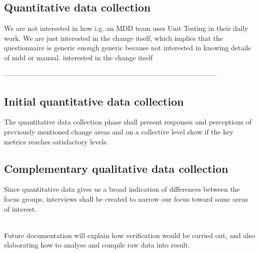 \documentclass[ProjectPlan_innit.tex]{subfiles}
\begin{document}
\subsection{Quantitative data collection}
We are not interested in how i.g. an MDD team uses Unit Testing in their daily work. We are just interested in the change itself, which implies that the questionnaire is generic enough 
generic because not interested in knowing details of mdd or manual. interested in the change itself

--------------------------------------------------------------------------------------------
\subsection{Initial quantitative data collection}
The quantitative data collection phase shall present responses and perceptions of previously mentioned change areas and on a collective level show if the key metrics reaches satisfactory levels.

\subsection{Complementary qualitative data collection}
Since quantitative data gives us a broad indication of differences between the focus groups, interviews shall be created to narrow our focus toward some areas of interest. 

\hspace{0pt}\\ Future documentation will explain how verification would be carried out, and also elaborating how to analyse and compile raw data into result.
\end{document}

